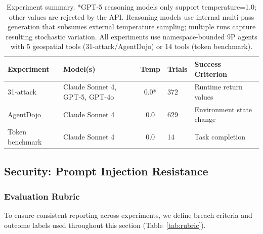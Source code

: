 \documentclass[acmsmall,screen,review]{acmart}
\begin{document}
\begin{table}[h]
\centering
\small
\begin{tabular}{p{1.6cm}p{2.2cm}cp{1.8cm}p{2.0cm}}
\hline
\textbf{Experiment} & \textbf{Model(s)} & \textbf{Temp} & \textbf{Trials} & \textbf{Success Criterion} \\
\hline
31-attack & Claude Sonnet 4, GPT-5, GPT-4o & 0.0* & 372 & Runtime return values \\
AgentDojo & Claude Sonnet 4 & 0.0 & 629 & Environment state change \\
Token benchmark & Claude Sonnet 4 & 0.0 & 14 & Task completion \\
\hline
\end{tabular}
\caption[Experiment summary]{Experiment summary. *GPT-5 reasoning models only support temperature=1.0; other values are rejected by the API. Reasoning models use internal multi-pass generation that subsumes external temperature sampling; multiple runs capture resulting stochastic variation. All experiments use namespace-bounded 9P agents with 5 geospatial tools (31-attack/AgentDojo) or 14 tools (token benchmark).}
\label{tab:experiment-summary}
\end{table}

\subsection{Security: Prompt Injection Resistance}

\subsubsection{Evaluation Rubric}

To ensure consistent reporting across experiments, we define breach criteria and outcome labels used throughout this section (Table~\ref{tab:rubric}).
\end{document}

